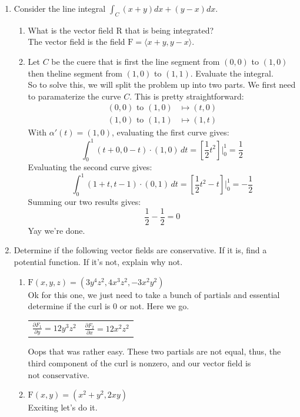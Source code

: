 \documentclass[10pt,oneside]{book}
\newcommand{\prt}[2]{\frac{\partial #1}{\partial #2}}
\newcommand{\dsp}{\displaystyle}
\newcommand{\en}{\vspace{0.25cm}\\}
\newcommand{\centerit}[1]{{\begin{center} #1 \end{center}}}
\begin{document}
\begin{enumerate}
    \item Consider the line integral $\int_C (x+y)dx+(y-x)dx$. 
    \begin{enumerate}
        \item[(a)] What is the vector field $\mathrm R$ that is being integrated?\en
        The vector field is the field $\mathrm F = \langle x+y, y-x\rangle$. 
        \item[(b)] Let $C$ be the cuere that is first the line segment from $(0,0)$ to $(1,0)$ then theline segment from $(1,0)$ to $(1,1)$. Evaluate the integral. \en
        So to solve this, we will split the problem up into two parts. We first need to paramaterize the curve $C$. This is pretty straightforward:
        \begin{align*}
            (0,0)\text{ to }(1,0)&\mapsto (t, 0)\\
            (1,0)\text{ to }(1,1)&\mapsto (1, t)
        \end{align*}
        With $\alpha'(t) = (1,0)$, evaluating the first curve gives:
        \[\int_0^1(t + 0, 0 - t)\cdot(1,0)\,dt = \left[\frac{1}2t^2\right]\Big|_0^1= \frac{1}2\]
        Evaluating the second curve gives:
        \[\int_0^1 (1 +t, t - 1)\cdot(0,1)\,dt = \left[\frac{1}2t^2-t\right]\Big|_0^1 = -\frac{1}2\]
        Summing our two results gives:
        \[\frac{1}2-\frac{1}2 = 0\]
        Yay we're done. 
    \end{enumerate}
    \item Determine if the following vector fields are conservative. If it is, find a potential function. If it's not, explain why not.
    \begin{enumerate}
        \item [(a)] $\mathrm F(x,y,z) = (3y^4z^2, 4x^3z^2, -3x^2y^2)$\en{}
        Ok for this one, we just need to take a bunch of partials and essential determine if the curl is 0 or not. Here we go.
        \centerit{
        \begin{tabular}{cc}
            $\dsp\prt{F_1}{y} = 12y^3z^2$ & $\dsp\prt{F_2}{x}=12x^2z^2$ \\
        \end{tabular}
        }
        Oops that was rather easy. These two partials are not equal, thus, the third component of the curl is nonzero, and our vector field is $\boxed{\text{not conservative}}$. 
        \item [(b)] $\mathrm F(x,y) = (x^2+y^2,2xy)$\en
        Exciting let's do it.

\end{enumerate}
\end{enumerate}
\end{document}
